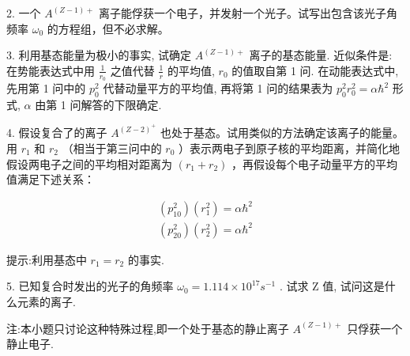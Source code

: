 2. 一个 $A^{(Z - 1)+}$ 离子能俘获一个电子，并发射一个光子。试写出包含该光子角频率 $\omega_0$ 的方程组，但不必求解。

3. 利用基态能量为极小的事实, 试确定 $A^{(Z-1)+}$ 离子的基态能量. 近似条件是: 在势能表达式中用 $\frac{1}{r_0}$ 之值代替 $\frac{1}{r}$ 的平均值, $r_0$ 的值取自第 1 问. 在动能表达式中, 先用第 1 问中的 $p_0^2$ 代替动量平方的平均值, 再将第 1 问的结果表为 $p_0^2 r_0^2 = \alpha \hbar^2$ 形式, $\alpha$ 由第 1 问解答的下限确定.

4. 假设复合了的离子 $A^{(Z - 2)^+}$ 也处于基态。试用类似的方法确定该离子的能量。用 $r_1$ 和 $r_2$ （相当于第三问中的 $r_0$ ）表示两电子到原子核的平均距离，并简化地假设两电子之间的平均相对距离为 $(r_1 + r_2)$ ，再假设每个电子动量平方的平均值满足下述关系：

$$
\begin{array}{l} (p _ {1 0} ^ {2}) (r _ {1} ^ {2}) = \alpha \hbar^ {2} \\ (p _ {2 0} ^ {2}) (r _ {2} ^ {2}) = \alpha \hbar^ {2} \end{array}
$$

提示:利用基态中 $r_{1}=r_{2}$ 的事实.

5. 已知复合时发出的光子的角频率 $\omega_{0}=1.114\times10^{17}s^{-1}$ . 试求 Z 值, 试问这是什么元素的离子.

注:本小题只讨论这种特殊过程,即一个处于基态的静止离子 $A^{(Z-1)+}$ 只俘获一个静止电子.
\vfill

\newpage